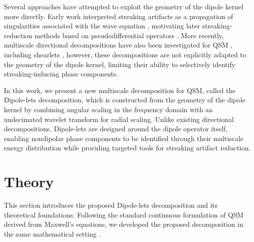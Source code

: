 \documentclass{article}
\begin{document}
Several approaches have attempted to exploit the geometry of the dipole kernel more directly. Early work interpreted streaking artifacts as a propagation of singularities associated with the wave equation \cite{choi2014inverse,zhou2017dipole}, motivating later streaking-reduction methods based on pseudodifferential operators \cite{palacios2017reducing,hormander2007analysis}. More recently, multiscale directional decompositions have also been investigated for QSM \cite{starck2010sparse,huang2023robust,ahn2020quantitative}, including shearlets \cite{labate2005sparse}, however, these decompositions are not explicitly adapted to the geometry of the dipole kernel, limiting their ability to selectively identify streaking-inducing phase components.

In this work, we present a new multiscale decomposition for QSM, called the Dipole-lets decomposition, which is constructed from the geometry of the dipole kernel by combining angular scaling in the frequency domain with an undecimated wavelet transform \cite{starck2007undecimated} for radial scaling. Unlike existing directional decompositions, Dipole-lets are designed around the dipole operator itself, enabling nondipolar phase components to be identified through their multiscale energy distribution while providing targeted tools for streaking artifact reduction.

\section{Theory}\label{sec:theory}

This section introduces the proposed Dipole-lets decomposition and its theoretical foundations. Following the standard continuous formulation of QSM derived from Maxwell's equations, we developed the proposed decomposition in the same mathematical setting \cite{salomir2003fast, marques2005application}.
\end{document}
